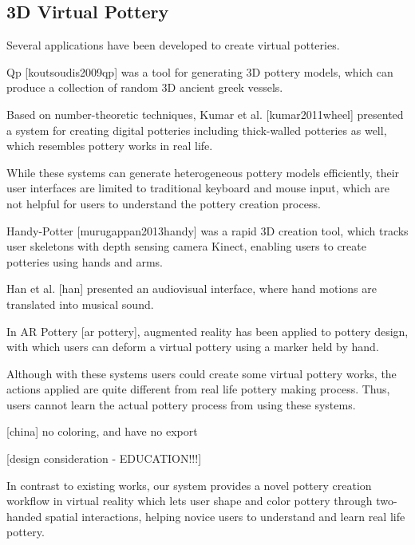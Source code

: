 \subsection{3D Virtual Pottery}
\label{sec:2}









Several applications have been developed to create virtual potteries.

Qp [koutsoudis2009qp] was a tool for generating 3D pottery models, which can produce a collection of random 3D ancient greek vessels.

Based on number-theoretic techniques, Kumar et al. [kumar2011wheel] presented a system for creating digital potteries including thick-walled potteries as well, which resembles pottery works in real life.

While these systems can generate heterogeneous pottery models efficiently, their user interfaces are limited to traditional keyboard and mouse input, which are not helpful for users to understand the pottery creation process.

Handy-Potter [murugappan2013handy] was a rapid 3D creation tool, which tracks user skeletons with depth sensing camera Kinect, enabling users to create potteries using hands and arms.

Han et al. [han] presented an audiovisual interface, where hand motions are translated into musical sound.

In AR Pottery [ar pottery], augmented reality has been applied to pottery design, with which users can deform a virtual pottery using a marker held by hand.

Although with these systems users could create some virtual pottery works, the actions applied are quite different from real life pottery making process. Thus, users cannot learn the actual pottery process from using these systems.

[china]
no coloring, and have no export

[design consideration - EDUCATION!!!]

In contrast to existing works, our system provides a novel pottery creation workflow in virtual reality which lets user shape and color pottery through two-handed spatial interactions, helping novice users to understand and learn real life pottery.












